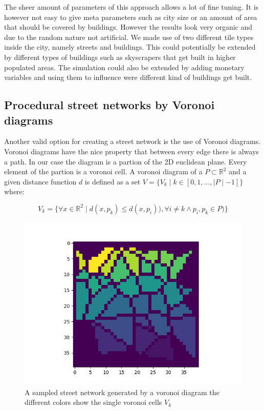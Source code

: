 \documentclass{scrartcl}
\begin{document}
The sheer amount of parameters of this approach allows a lot of fine tuning.
It is however not easy to give meta parameters such as city size or an amount
of area that should be covered by buildings. However the results look very organic
and due to the random nature not artificial. We made use of two different tile types
inside the city, namely streets and buildings. This could potentially be extended
by different types of buildings such as skyscrapers that get built in higher
populated areas. The simulation could also be extended by adding monetary variables
and using them to influence were different kind of buildings get built.


\subsection{Procedural street networks by Voronoi diagrams}

Another valid option for creating a street network is the use of Voronoi diagrams.
Voronoi diagrams have the nice property that between every edge there is always a path.
In our case the diagram is a partion of the 2D euclidean plane.
Every element of the partion is a voronoi cell.
A voronoi diagram of a  $ P \subset \mathbb{R}^2 $ and a given distance
function $d$ is defined as a set $V=\lbrace V_k \mid k \in [0,1,\ldots,\mid P\mid-1] \rbrace$ where:

\[
    V_k=\lbrace \forall x \in \mathbb{R}^2 \mid d(x,p_k) \leq d(x,p_i)), \forall i \ne k \land p_i,p_k \in P ) \rbrace
\]

\begin{figure}
    \centering
    \includegraphics[scale = 0.5]{voro}
    \caption{A sampled street network generated by a voronoi diagram
    the different colors show the single voronoi cells $V_k$}
    \label{fig:voronoi}
\end{figure}
\end{document}
